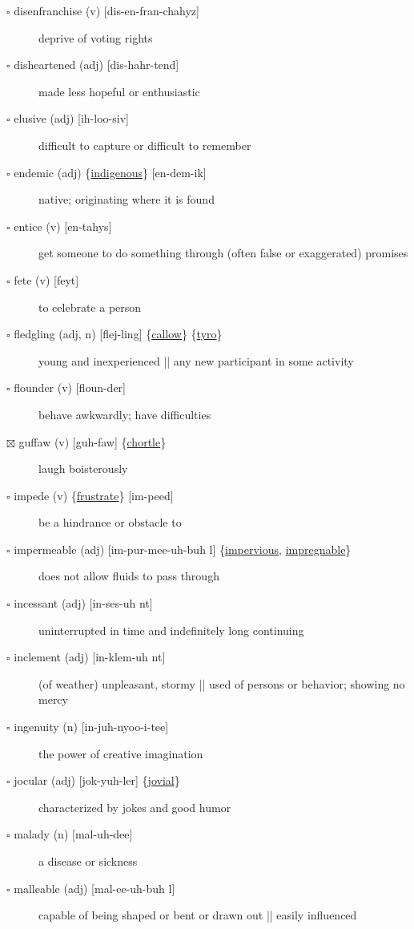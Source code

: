 \documentclass[11pt]{article}
\begin{document}
\begin{description}
\item[{$\square$ disenfranchise (v) [dis-en-fran-chahyz]}] deprive of voting rights
\item[{$\square$ disheartened (adj) [dis-hahr-tend]}] made less hopeful or enthusiastic
\item[{$\square$ elusive (adj) [ih-loo-siv]}] difficult to capture or difficult to remember
\item[{$\square$ \label{org65cd524}endemic (adj) \{\hyperref[org062cbaf]{indigenous}\} [en-dem-ik]}] native; originating where it is found
\item[{$\square$ entice (v) [en-tahys]}] get someone to do something through (often false or exaggerated) promises
\item[{$\square$ fete (v) [feyt]}] to celebrate a person
\item[{$\square$ \label{orgecf834e}fledgling (adj, n) [flej-ling] \{\hyperref[org46bdddd]{callow}\} \{\hyperref[org1f29c8d]{tyro}\}}] young and inexperienced || any new participant in some activity
\item[{$\square$ flounder (v) [floun-der]}] behave awkwardly; have difficulties
\item[{$\boxtimes$ \label{org9a6cddf}guffaw (v) [guh-faw] \{\hyperref[org4d7ee4d]{chortle}\}}] laugh boisterously
\item[{$\square$ \label{orgba888b0}impede (v) \{\hyperref[orgf536104]{frustrate}\} [im-peed]}] be a hindrance or obstacle to
\item[{$\square$ \label{org9e4e4c7}impermeable (adj) [im-pur-mee-uh-buh l] \{\hyperref[orgf7513d4]{impervious}, \hyperref[org5101e50]{impregnable}\}}] does not allow fluids to pass through
\item[{$\square$ incessant (adj) [in-ses-uh nt]}] uninterrupted in time and indefinitely long continuing
\item[{$\square$ inclement (adj) [in-klem-uh nt]}] (of weather) unpleasant, stormy || used of persons or behavior; showing no mercy
\item[{$\square$ ingenuity (n) [in-juh-nyoo-i-tee]}] the power of creative imagination
\item[{$\square$ \label{org894210d}jocular (adj) [jok-yuh-ler] \{\hyperref[orgc169544]{jovial}\}}] characterized by jokes and good humor
\item[{$\square$ malady (n) [mal-uh-dee]}] a disease or sickness
\item[{$\square$ malleable (adj) [mal-ee-uh-buh l]}] capable of being shaped or bent or drawn out || easily influenced

\end{description}
\end{document}
